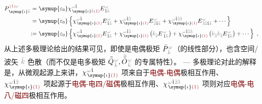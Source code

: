 \begin{subequations}
\begin{align}
	P^{\;\! \textcolor{Maroon}{(1)} \mathcolor{gray}{\omega}}_{\;\! \symup{\iota}\mathcolor{gray}{\bar{k}}} =&~ {\symup{\varepsilon_0}} \chi^{\;\! \mathcolor{gray}{\omega} \hat{1}}_{\;\! \symup{\iota} \mathcolor{gray}{\bar{k}} \textcolor{Maroon}{(1)}} E^{\;\!\mathcolor{gray}{\omega}}_{\;\! \hat{1} \mathcolor{gray}{\bar{k}}} \\ =&~ {\symup{\varepsilon_0}} \left\{ \chi^{\;\! \mathcolor{gray}{\omega} \hat{1}}_{\;\! \symup{\iota} \textcolor{Maroon}{(1)}} E^{\;\!\mathcolor{gray}{\omega}}_{\;\! \hat{1} \mathcolor{gray}{\bar{k}}} + \chi^{\;\! \mathcolor{gray}{\omega} \hat{1} \mathcolor{gray}{\hat{2}}}_{\;\! \symup{\iota} \textcolor{Maroon}{(1)}} E^{\;\!\mathcolor{gray}{\omega}}_{\;\! \mathcolor{gray}{\hat{2}} \hat{1} \mathcolor{gray}{\bar{k}}} + \chi^{\;\! \mathcolor{gray}{\omega} \hat{1} \mathcolor{gray}{\hat{2} \hat{3}}}_{\;\! \symup{\iota} \textcolor{Maroon}{(1)}} E^{\;\!\mathcolor{gray}{\omega}}_{\;\! \mathcolor{gray}{\hat{3} \hat{2}} \hat{1} \mathcolor{gray}{\bar{k}}} + \cdots \right\}  \label{eq:P(1)_wk} \\ :=&~ {\symup{\varepsilon_0}} \left\{ \chi^{\;\! \mathcolor{gray}{\omega} \hat{1}}_{\;\! \symup{\iota} \textcolor{Maroon}{(1)}} E^{\;\!\mathcolor{gray}{\omega}}_{\;\! \hat{1} \mathcolor{gray}{\bar{k}}} + \chi^{\;\! \mathcolor{gray}{\omega} \hat{1} \mathcolor{gray}{\hat{2}}}_{\;\! \symup{\iota} \textcolor{Maroon}{(1)}} \left( \mathcolor{gray}{k_{\hat{2}}} E^{\;\!\mathcolor{gray}{\omega}}_{\;\hat{1} \mathcolor{gray}{\bar{k}}} \right) + \chi^{\;\! \mathcolor{gray}{\omega} \hat{1} \mathcolor{gray}{\hat{2} \hat{3}}}_{\;\! \symup{\iota} \textcolor{Maroon}{(1)}} \left( \mathcolor{gray}{k_{\hat{3}}} \mathcolor{gray}{k_{\hat{2}}} E^{\;\!\mathcolor{gray}{\omega}}_{\;\! \hat{1} \mathcolor{gray}{\bar{k}}} \right) + \cdots \right\}~,
\end{align}
\end{subequations}
从上述多极理论给出的结果可见，即使是电偶极矩 $\bar{P}^{\;\!\mathcolor{gray}{\omega}}_{\;\!\mathcolor{gray}{\bar{k}}}$（的线性部分），也含空间/波矢 $\mathcolor{gray}{\bar{k}}$ 色散（而不仅是电多极矩 $\bar{\bar{Q}}^{\;\!\mathcolor{gray}{\omega}}_{\;\!\mathcolor{gray}{\bar{k}}},\bar{\bar{\bar{O}}}^{\;\!\mathcolor{gray}{\omega}}_{\;\!\mathcolor{gray}{\bar{k}}}$ 的专属特性）。 ---  多极理论对此的解释是，从微观起源上来讲，$\chi^{\;\! \mathcolor{gray}{\omega} \hat{1}}_{\;\! \symup{\iota} \textcolor{Maroon}{(1)}}$ 项来自于\textcolor{Maroon}{电偶-电偶}极相互作用、$\chi^{\;\! \mathcolor{gray}{\omega} \hat{1} \mathcolor{gray}{\hat{2}}}_{\;\! \symup{\iota} \textcolor{Maroon}{(1)}}$ 项起源于\textcolor{Maroon}{电偶-电四/磁偶}极相互作用、$\chi^{\;\! \mathcolor{gray}{\omega} \hat{1} \mathcolor{gray}{\hat{2} \hat{3}}}_{\;\! \symup{\iota} \textcolor{Maroon}{(1)}}$ 项则对应\textcolor{Maroon}{电偶-电八/磁四}极相互作用。

